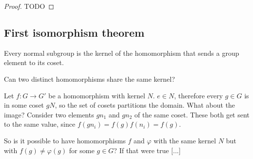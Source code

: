 \begin{proof}
  TODO
\end{proof}
\newpage
\subsection{First isomorphism theorem}


Every normal subgroup is the kernel of the homomorphism that sends a group element to its coset.

Can two distinct homomorphisms share the same kernel?

Let $f: G \rightarrow G'$ be a homomorphism with kernel $N$. $e \in N$,
therefore every $g \in G$ is in some coset $gN$, so the set of cosets
partitions the domain. What about the image? Consider two elements $gn_1$ and
$gn_2$ of the same coset. These both get sent to the same value, since
$f(gn_i) = f(g)f(n_i) = f(g)$.

So is it possible to have homomorphisms $f$ and $\varphi$ with the same kernel
$N$ but with $f(g) \neq \varphi(g)$ for some $g \in G$? If that were true [...]

